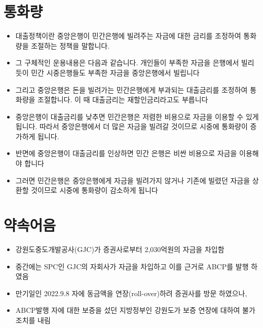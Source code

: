 \documentclass[
]{book}
\providecommand{\tightlist}{%
  \setlength{\itemsep}{0pt}\setlength{\parskip}{0pt}}
\begin{document}
\hypertarget{uxd1b5uxd654uxb7c9}{%
\section{통화량}\label{uxd1b5uxd654uxb7c9}}

\begin{itemize}
\tightlist
\item
  대출정책이란 중앙은행이 민간은행에 빌려주는 자금에 대한 금리를 조정하여 통화량을 조절하는 정책을 말합니다.\\
\item
  그 구체적인 운용내용은 다음과 같습니다. 개인들이 부족한 자금을 은행에서 빌리듯이 민간 시중은행들도 부족한 자금을 중앙은행에서 빌립니다\\
\item
  그리고 중앙은행은 돈을 빌려가는 민간은행에게 부과되는 대출금리를 조정하여 통화량을 조절합니다. 이 때 대출금리는 재할인금리라고도 부릅니다\\
\item
  중앙은행이 대출금리를 낮추면 민간은행은 저렴한 비용으로 자금을 이용할 수 있게 됩니다. 따라서 중앙은행에서 더 많은 자금을 빌려갈 것이므로 시중에 통화량이 증가하게 됩니다.\\
\item
  반면에 중앙은행이 대출금리를 인상하면 민간 은행은 비싼 비용으로 자금을 이용해야 합니다\\
\item
  그러면 민간은행은 중앙은행에게 자금을 빌려가지 않거나 기존에 빌렸던 자금을 상환할 것이므로 시중에 통화량이 감소하게 됩니다
\end{itemize}

\hypertarget{uxc57duxc18duxc5b4uxc74c}{%
\section{약속어음}\label{uxc57duxc18duxc5b4uxc74c}}

\begin{itemize}
\tightlist
\item
  강원도중도개발공사(GJC)가 증권사로부터 2,030억원의 자금을 차입함
\item
  중간에는 SPC인 GJC의 자회사가 자금을 차입하고 이를 근거로 ABCP를 발행 하였음
\item
  만기일인 2022.9.8 자에 동금액을 연장(roll-over)하려 증권사를 방문 하였으나,
\item
  ABCP발행 자에 대한 보증을 섰던 지방정부인 강원도가 보증 연장에 대하여 불가 조치를 내림
\end{itemize}
\end{document}

